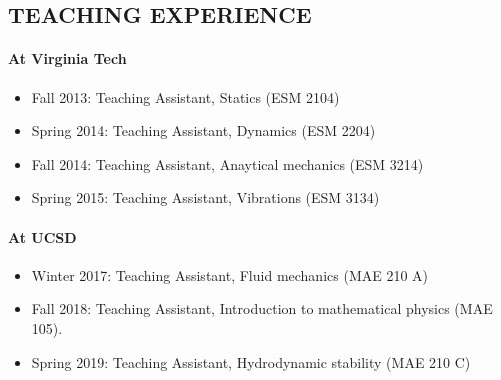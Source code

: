 \documentclass[10pt]{res} %
\begin{document}
\begin{resume}
\section{{TEACHING EXPERIENCE}}
\paragraph{At Virginia Tech} 
\begin{itemize}
	\vspace*{2mm}
	\item Fall 2013: Teaching Assistant, Statics  (ESM 2104)
	\item Spring 2014: Teaching Assistant, Dynamics (ESM 2204)
	\item Fall 2014: Teaching Assistant, Anaytical mechanics (ESM 3214)
	\item Spring 2015: Teaching Assistant, Vibrations (ESM 3134)
\end{itemize}

\paragraph{At UCSD} 
\begin{itemize}
    \vspace*{2mm}
	\item Winter 2017: Teaching Assistant, Fluid mechanics (MAE 210 A)
	\item Fall   2018: Teaching Assistant, Introduction to mathematical physics (MAE 105).
	\item Spring 2019: Teaching Assistant, Hydrodynamic stability (MAE 210 C)
\end{itemize}

\vspace*{0.1 in}







\end{resume}
\end{document}
